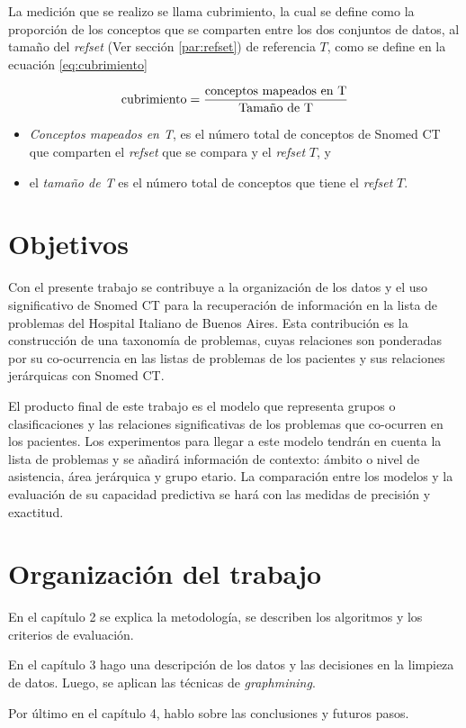 La medición que se realizo se llama cubrimiento, la cual se define como la proporción de los conceptos que se comparten entre los dos conjuntos de datos, al tamaño del \textit{\acrshort{refset}} (Ver sección \ref{par:refset}) de referencia $T$, como se define en la ecuación \ref{eq:cubrimiento}

\begin{equation}\label{eq:cubrimiento}
\textup{cubrimiento} = \frac{\textup{conceptos mapeados en T}}{\textup{Tamaño de T}}
\end{equation}

\begin{itemize}
\item \textit{Conceptos mapeados en T}, es el número total de conceptos de Snomed CT que comparten el \textit{refset} que se compara y el \textit{refset} $T$, y
\item el \textit{tamaño de T} es el número total de conceptos que tiene el \textit{refset} $T$.
\end{itemize}

\section{Objetivos}
Con el presente trabajo se contribuye a la organización de los datos y el uso significativo de Snomed CT para la recuperación de información en la lista de problemas del Hospital Italiano de Buenos Aires. Esta contribución es la construcción de una taxonomía de problemas, cuyas relaciones son ponderadas por su co-ocurrencia en las listas de problemas de los pacientes y sus relaciones jerárquicas con Snomed CT.

El producto final de este trabajo es el modelo que representa grupos o clasificaciones y las relaciones significativas de los problemas que co-ocurren en los pacientes. Los experimentos para llegar a este modelo tendrán en cuenta la lista de problemas y se añadirá  información de contexto: ámbito o nivel de asistencia, área jerárquica y grupo etario. La comparación entre los modelos y la evaluación de su capacidad predictiva se hará con las medidas de precisión y exactitud. 

\section{Organización del trabajo}
% 
% 
En el capítulo 2 se explica la metodología, se describen los algoritmos y los criterios de evaluación.

En el capítulo 3 hago una descripción de los datos y las decisiones en la limpieza de datos. Luego, se aplican las técnicas de \textit{graphmining}.
 
Por último en el capítulo 4, hablo sobre las conclusiones y futuros pasos.
